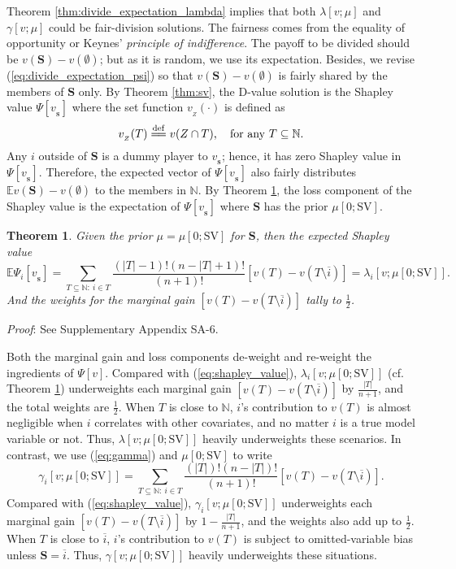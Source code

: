 \documentclass[a4paper,12pt]{article}
\newtheorem{theorem}{Theorem}
\newcommand{\eqdef}{\overset{\mathrm{def}}{=\joinrel=}}
\begin{document}
Theorem \ref{thm:divide_expectation_lambda} implies that both $\lambda [v; \mu]$ and $\gamma[v;\mu]$ could be fair-division solutions. 
The fairness comes from the equality of opportunity or Keynes' \textit{principle of indifference}.
The payoff to be divided should be $v(\mathbf{S})-v(\emptyset)$; but as it is random, we use its expectation. 
Besides, we revise (\ref{eq:divide_expectation_psi}) so that $ v(\mathbf{S}) - v(\emptyset)$ is fairly shared by the members of $\mathbf{S}$ only. 
By Theorem \ref{thm:sv}, the D-value solution is the Shapley value $\Psi [v_{_\mathbf{S}}]$ where the set function $v_{_Z}(\cdot)$ is defined as 
$$
v_{_Z} (T) \eqdef v(Z \cap T), \quad \mathrm{for}\ \mathrm{any} \ T\subseteq \mathbb{N}.
$$
Any $i$ outside of $\mathbf{S}$ is a dummy player to $v_{_\mathbf{S}}$; hence, it has zero Shapley value in $\Psi [v_{_\mathbf{S}}]$.
Therefore, the expected vector of $\Psi [v_{_\mathbf{S}}]$ also fairly distributes $\mathbb{E} v(\mathbf{S}) - v(\emptyset)$ to the members in $\mathbb{N}$.
By Theorem \ref{thm:expected_SV}, the loss component of the Shapley value is the expectation of $\Psi [v_{_\mathbf{S}}]$
where $\mathbf{S}$ has the prior $\mu[0; \mathrm{SV}]$.

\begin{theorem}\label{thm:expected_SV} 
Given the prior $\mu = \mu[0;\mathrm{SV}]$ for $\mathbf{S}$, then the expected Shapley value 
$$
\mathbb{E} \Psi_i [v_{_\mathbf{S}}] 
= 
\sum\limits_{T\subseteq \mathbb{N}: \ i \in T} \frac{(|T|-1)!(n-|T|+1)!}{(n+1)!} \left [v(T) - v(T\setminus \overline{i}) \right ]
=
\lambda_i[v;\mu[0;\mathrm{SV}]].
$$
And the weights for the marginal gain $\left [ v(T) - v(T\setminus \overline{i})\right ]$ tally to $\frac{1}{2}$.
\end{theorem}

\noindent \textit{Proof}: See Supplementary Appendix SA-6.

Both the marginal gain and loss components de-weight and re-weight the ingredients of $\Psi[v]$. 
Compared with (\ref{eq:shapley_value}), $\lambda_i[v;\mu[0;\mathrm{SV}]]$ (cf. Theorem \ref{thm:expected_SV}) underweights each marginal gain $\left [v(T) - v(T\setminus \overline{i}) \right ]$ by $\frac{|T|}{n+1}$, and the total weights are $\frac{1}{2}$.
When $T$ is close to $\mathbb{N}$, $i$'s contribution to $v(T)$ is almost negligible when $i$ correlates with other covariates, and no matter $i$ is a true model variable or not. 
Thus, $\lambda[v;\mu[0;\mathrm{SV}]]$ heavily underweights these scenarios.
In contrast, we use (\ref{eq:gamma}) and $\mu[0;\mathrm{SV}]$ to write 
$$
\gamma_i[v;\mu[0;\mathrm{SV}]] = \sum\limits_{T\subseteq \mathbb{N}: \ i \in T} \frac{(|T|)!(n-|T|)!}{(n+1)!} \left [v(T) - v(T\setminus \overline{i}) \right ].
$$
Compared with (\ref{eq:shapley_value}), $\gamma_i[v;\mu[0;\mathrm{SV}]]$ underweights each marginal gain $\left [v(T) - v(T\setminus \overline{i}) \right ]$ by $1-\frac{|T|}{n+1}$, and the weights also add up to $\frac{1}{2}$. 
When $T$ is close to $\overline{i}$, $i$'s contribution to $v(T)$ is subject to omitted-variable bias unless $\mathbf{S}=\overline{i}$. 
Thus, $\gamma[v;\mu[0;\mathrm{SV}]]$ heavily underweights these situations.
\end{document}

